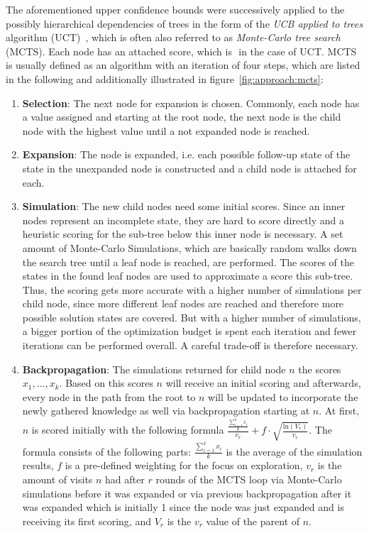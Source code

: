 The aforementioned upper confidence bounds were successively applied to the possibly hierarchical dependencies of trees in the form of the \textit{UCB applied to trees} algorithm (UCT)~\cite{Kocsis-UCT}, which is often also referred to as \textit{Monte-Carlo tree search} (MCTS).
Each node has an attached score, which is $ $ in the case of UCT.
MCTS is usually defined as an algorithm with an iteration of four steps, which are listed in the following and additionally illustrated in figure~\ref{fig:approach:mcts}:
\begin{enumerate}
    \item \textbf{Selection}: The next node for expansion is chosen.
    Commonly, each node has a value assigned and starting at the root node, the next node is the child node with the highest value until a not expanded node is reached.
    \item \textbf{Expansion}: The node is expanded, i.e. each possible follow-up state of the state in the unexpanded node is constructed and a child node is attached for each.
    \item \textbf{Simulation}: The new child nodes need some initial scores.
    Since an inner nodes represent an incomplete state, they are hard to score directly and a heuristic scoring for the sub-tree below this inner node is necessary.
    A set amount of Monte-Carlo Simulations, which are basically random walks down the search tree until a leaf node is reached, are performed.
    The scores of the states in the found leaf nodes are used to approximate a score this sub-tree.
    Thus, the scoring gets more accurate with a higher number of simulations per child node, since more different leaf nodes are reached and therefore more possible solution states are covered.
    But with a higher number of simulations, a bigger portion of the optimization budget is spent each iteration and fewer iterations can be performed overall.
    A careful trade-off is therefore necessary.
    \item \textbf{Backpropagation}: The simulations returned for child node $n$ the scores $x_1, ..., x_k$.
    Based on this scores $n$ will receive an initial scoring and afterwards, every node in the path from the root to $n$ will be updated to incorporate the newly gathered knowledge as well via backpropagation starting at $n$.
    At first, $n$ is scored initially with the following formula $\frac{\frac{\sum_{i=1}^k x_i}{k}}{v_r} + f \cdot \sqrt{\frac{\mathrm{ln} (V_r)}{v_r}}$.
    The formula consists of the following parts: $\frac{\sum_{i=1}^k x_i}{k}$ is the average of the simulation results, $f$ is a pre-defined weighting for the focus on exploration, $v_r$ is the amount of visits $n$ had after $r$ rounds of the MCTS loop via Monte-Carlo simulations before it was expanded or via previous backpropagation after it was expanded which is initially 1 since the node was just expanded and is receiving its first scoring, and $V_r$ is the $v_r$ value of the parent of $n$.

\end{enumerate}
